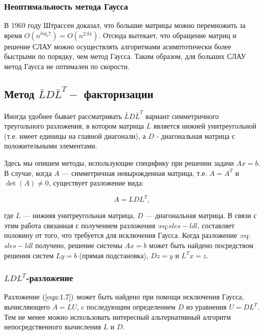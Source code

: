 \documentclass[a4paper]{article}
\begin{document}
\subsubsection{Неоптимальность метода Гаусса}

В 1969 году Штрассен доказал, что большие матрицы можно перемножить за время $O(n^{log_2 7}) = O(n^{2.81})$. Отсюда вытекает, что обращение матриц и решение СЛАУ можно осуществлять алгоритмами асимптотически более быстрыми по порядку, чем метод Гаусса. Таким образом, для больших СЛАУ метод Гаусса не оптимален по скорости.

\subsection{Метод $\bar{L} D \bar{L}^{T}-$ факторизации}

Иногда удобнее бывает рассматривать $\bar{L} D \bar{L}^{T}$  вариант симметричного треугольного разложения, в котором матрица $L$ является нижней унитреугольной (т.е. имеет единицы на главной диагонали), а $D$ - диагональная матрица с положительными элементами.

Здесь мы опишем методы, использующие специфику при решении задачи
\(Ax = b\). В случае, когда \(A\) --- симметричная невырожденная
матрица, т.е. \(A = A^T\) и \(\det(A) \ne 0\), существует разложение
вида:

\begin{equation}
    \label{eqn:1.7}
    A = L D L^T,
\end{equation}


 где \(L\) --- нижняя унитреугольная матрица, \(D\) --- диагональная
матрица. В связи с этим работа связанная с получением разложения
:eq:\(sles-ldl\), составляет половину от того, что требуется для
исключения Гаусса. Когда разложение :eq:\(sles-ldl\) получено, решение
системы \(Ax = b\) может быть найдено посредством решения систем
\(Ly = b\) (прямая подстановка), \(Dz = y\) и \(L^T x = z\).

\subsubsection{\texorpdfstring{\(LDL^T\)-разложение}{LDL\^{}T-разложение}}\label{sles:direct:ld:ldl}

Разложение $(\ref{eqn:1.7})$ может быть найдено при
помощи исключения Гаусса, вычисляющего \(A = LU\), c последующим
определением \(D\) из уравнения \(U = DL^T\). Тем не менее можно
использовать интересный альтернативный алгоритм непосредственного
вычисления \(L\) и \(D\).
\end{document}
